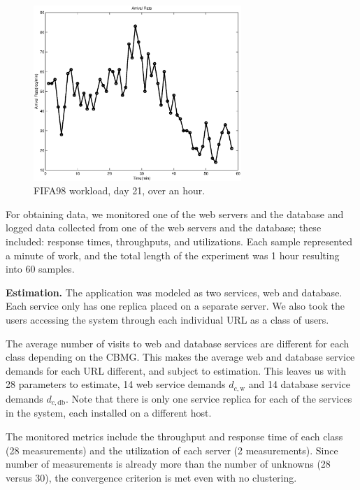  \begin{figure}[hp]
	\centering
		\includegraphics[width=0.7\textwidth]{image/workload-arr-rate.eps}
	\caption[FIFA98 workload, day 21, over an hour, used in demonstration of the estimation algorithm.]{FIFA98 workload, day 21, over an hour.}
	\label{fig:fig2}
\end{figure}
For obtaining data, we monitored one of the web servers and the database and logged data collected from one of the web servers and the database; these included: response times, throughputs, and utilizations. Each sample represented a minute of work, and the total length of the experiment was 1 hour resulting into 60 samples.

 \textbf{Estimation.} 
    The application was modeled as two services, web and database. Each service only has one replica placed on a separate server. We also took the users accessing the system through each individual URL as a class of users. 
    
		The average number of visits to web and database services are different for each class depending on the CBMG. This makes the average web and database service demands for each URL different, and subject to estimation. This leaves us with 28 parameters to estimate, 14 web service demands $d_{c,\text{w}}$ and 14 database service demands $d_{c,\text{db}}$. Note that there is only one service replica for each of the services in the system, each installed on a different host.
		
		The monitored metrics include the throughput and response time of each class (28 measurements) and the utilization of each server (2 measurements). Since number of measurements is already more than the number of unknowns (28 versus 30), the convergence criterion is met even with no clustering.


